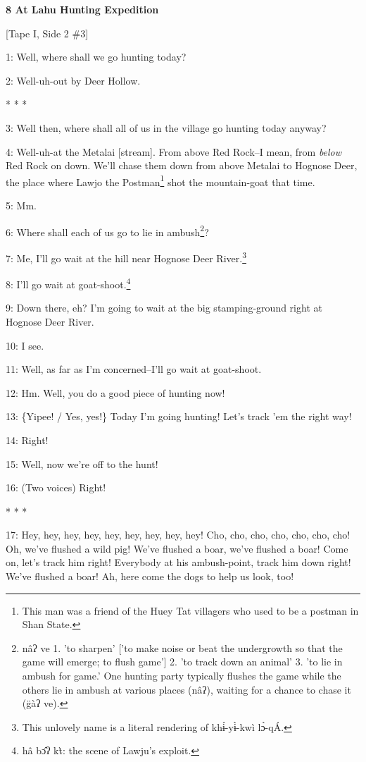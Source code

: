 
\textbf{8 At Lahu Hunting Expedition}

[Tape I, Side 2 \#3]

1: Well, where shall we go hunting today?

2: Well-uh-out by Deer Hollow.

\begin{center}
* * *
\end{center}

\leftskip=0pt
3: Well then, where shall all of us in the village go hunting today anyway?

4: Well-uh-at the Metalai [stream]. From above Red Rock--I mean, from \textit{below}
Red Rock on down. We'll chase them down from above Metalai to Hognose Deer, the
place where Lawjo the Postman\footnote{This man was a friend of the Huey Tat villagers who used to be a postman in Shan State.} shot the mountain-goat that time.

5: Mm.

6: Where shall each of us go to lie in ambush\footnote{nâʔ ve 1. 'to sharpen' ['to make noise or beat the undergrowth so that the game will emerge; to flush game'] 2. 'to track down an animal' 3. 'to lie in ambush for game.' One hunting party typically flushes the game while the others lie in ambush at various places (nâʔ), waiting for a chance to chase it (g̈àʔ ve).}?

7: Me, I'll go wait at the hill near Hognose Deer River.\footnote{This unlovely name is a literal rendering of khɨ́-yɨ̀-kwì lɔ̀-qÁ.}

8: I'll go wait at goat-shoot.\footnote{hâ bɔ̂ʔ kt̀: the scene of Lawju's exploit.}

9: Down there, eh? I'm going to wait at the big stamping-ground right at Hognose
Deer River.

10: I see.

11: Well, as far as I'm concerned--I'll go wait at goat-shoot.

12: Hm. Well, you do a good piece of hunting now!

13: \{Yipee! / Yes, yes!\} Today I'm going hunting! Let's track 'em the right way!

14: Right!

15: Well, now we're off to the hunt!

16: (Two voices) Right!

\begin{center}
* * *
\end{center}

\leftskip=0pt
17: Hey, hey, hey, hey, hey, hey, hey, hey, hey!  Cho, cho, cho, cho, cho, cho,
cho! Oh, we've flushed a wild pig! We've flushed a boar, we've flushed a boar!
Come on, let's track him right! Everybody at his ambush-point, track him down right!
We've flushed a boar! Ah, here come the dogs to help us look, too!


